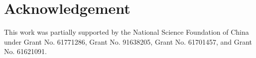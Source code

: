 \documentclass[journal]{IEEEtran}
\begin{document}
 


 
 
 
 
 \section*{Acknowledgement}
 
 This work was partially supported by the National Science Foundation of China under Grant No. 61771286, Grant No. 91638205, Grant No. 61701457, and Grant No. 61621091. %
 
\end{document}
